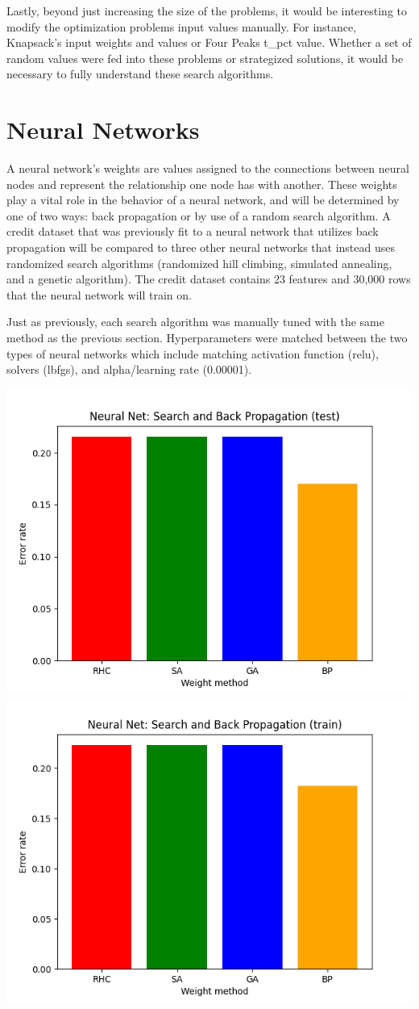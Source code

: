 \documentclass{article}
\begin{document}
Lastly, beyond just increasing the size of the problems, it would be interesting to modify the optimization problems input values manually. For instance, Knapsack's input weights and values or Four Peaks t\_pct value. Whether a set of random values were fed into these problems or strategized solutions, it would be necessary to fully understand these search algorithms.

\section{Neural Networks}

A neural network's weights are values assigned to the connections between neural nodes and represent the relationship one node has with another. These weights play a vital role in the behavior of a neural network, and will be determined by one of two ways: back propagation or by use of a random search algorithm. A credit dataset that was previously fit to a neural network that utilizes back propagation will be compared to three other neural networks that instead uses randomized search algorithms (randomized hill climbing, simulated annealing, and a genetic algorithm). The credit dataset contains 23 features and 30,000 rows that the neural network will train on.

Just as previously, each search algorithm was manually tuned with the same method as the previous section. Hyperparameters were matched between the two types of neural networks which include matching activation function (relu), solvers (lbfgs), and alpha/learning rate (0.00001).

\begin{center}
    \includegraphics[width=.49\linewidth]{neural_test.png}
    \includegraphics[width=.49\linewidth]{neural_train.png}
\end{center}
\end{document}
